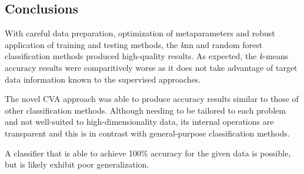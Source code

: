 \documentclass[12pt]{article}
\begin{document}
\subsection*{Conclusions}

With careful data preparation, optimization of metaparameters and robust application of training and testing methods, 
the \textit{k}nn and random forest classification methods produced high-quality results. 
As expected, the \textit{k}-means accuracy results were comparitively worse
as it does not take advantage of target data information known to the supervised approaches. 

The novel CVA approach was able to produce accuracy results
similar to those of other classification methods. 
Although needing to be tailored to each problem and not well-suited to high-dimensionality data, 
its internal operations are transparent and this is in contrast with general-purpose classification methods. 

A classifier that is able to achieve 100\% accuracy for the given data is possible, 
but is likely exhibit poor generalization.

\printbibliography
\end{document}
